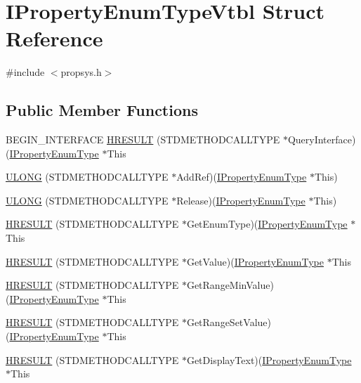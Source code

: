 \hypertarget{struct_i_property_enum_type_vtbl}{}\section{I\+Property\+Enum\+Type\+Vtbl Struct Reference}
\label{struct_i_property_enum_type_vtbl}


{\ttfamily \#include $<$propsys.\+h$>$}

\subsection*{Public Member Functions}
\begin{DoxyCompactItemize}
\item 
B\+E\+G\+I\+N\+\_\+\+I\+N\+T\+E\+R\+F\+A\+CE \hyperlink{struct_i_property_enum_type_vtbl_ac155ab342fcd5e1bdb3032aaf460ec30}{H\+R\+E\+S\+U\+LT} (S\+T\+D\+M\+E\+T\+H\+O\+D\+C\+A\+L\+L\+T\+Y\+PE $\ast$Query\+Interface)(\hyperlink{propsys_8h_adc254170104ee274e45ff35486ea9a9e}{I\+Property\+Enum\+Type} $\ast$This
\item 
\hyperlink{struct_i_property_enum_type_vtbl_a4ca7f8222036bd05bea166ba481c4c85}{U\+L\+O\+NG} (S\+T\+D\+M\+E\+T\+H\+O\+D\+C\+A\+L\+L\+T\+Y\+PE $\ast$Add\+Ref)(\hyperlink{propsys_8h_adc254170104ee274e45ff35486ea9a9e}{I\+Property\+Enum\+Type} $\ast$This)
\item 
\hyperlink{struct_i_property_enum_type_vtbl_afd0582337f24ecc607c12d2e009f990b}{U\+L\+O\+NG} (S\+T\+D\+M\+E\+T\+H\+O\+D\+C\+A\+L\+L\+T\+Y\+PE $\ast$Release)(\hyperlink{propsys_8h_adc254170104ee274e45ff35486ea9a9e}{I\+Property\+Enum\+Type} $\ast$This)
\item 
\hyperlink{struct_i_property_enum_type_vtbl_a8317b387b2021caff7ebc6386e00d5a7}{H\+R\+E\+S\+U\+LT} (S\+T\+D\+M\+E\+T\+H\+O\+D\+C\+A\+L\+L\+T\+Y\+PE $\ast$Get\+Enum\+Type)(\hyperlink{propsys_8h_adc254170104ee274e45ff35486ea9a9e}{I\+Property\+Enum\+Type} $\ast$This
\item 
\hyperlink{struct_i_property_enum_type_vtbl_a99fd96e40a2def9899603a14a4d47b1a}{H\+R\+E\+S\+U\+LT} (S\+T\+D\+M\+E\+T\+H\+O\+D\+C\+A\+L\+L\+T\+Y\+PE $\ast$Get\+Value)(\hyperlink{propsys_8h_adc254170104ee274e45ff35486ea9a9e}{I\+Property\+Enum\+Type} $\ast$This
\item 
\hyperlink{struct_i_property_enum_type_vtbl_a68102ff4c91c840d217dc14c4f5d54a8}{H\+R\+E\+S\+U\+LT} (S\+T\+D\+M\+E\+T\+H\+O\+D\+C\+A\+L\+L\+T\+Y\+PE $\ast$Get\+Range\+Min\+Value)(\hyperlink{propsys_8h_adc254170104ee274e45ff35486ea9a9e}{I\+Property\+Enum\+Type} $\ast$This
\item 
\hyperlink{struct_i_property_enum_type_vtbl_a01886024705d115b4305effe8862c129}{H\+R\+E\+S\+U\+LT} (S\+T\+D\+M\+E\+T\+H\+O\+D\+C\+A\+L\+L\+T\+Y\+PE $\ast$Get\+Range\+Set\+Value)(\hyperlink{propsys_8h_adc254170104ee274e45ff35486ea9a9e}{I\+Property\+Enum\+Type} $\ast$This
\item 
\hyperlink{struct_i_property_enum_type_vtbl_a906bf12e8a331d782a196c809d78c223}{H\+R\+E\+S\+U\+LT} (S\+T\+D\+M\+E\+T\+H\+O\+D\+C\+A\+L\+L\+T\+Y\+PE $\ast$Get\+Display\+Text)(\hyperlink{propsys_8h_adc254170104ee274e45ff35486ea9a9e}{I\+Property\+Enum\+Type} $\ast$This
\end{DoxyCompactItemize}
